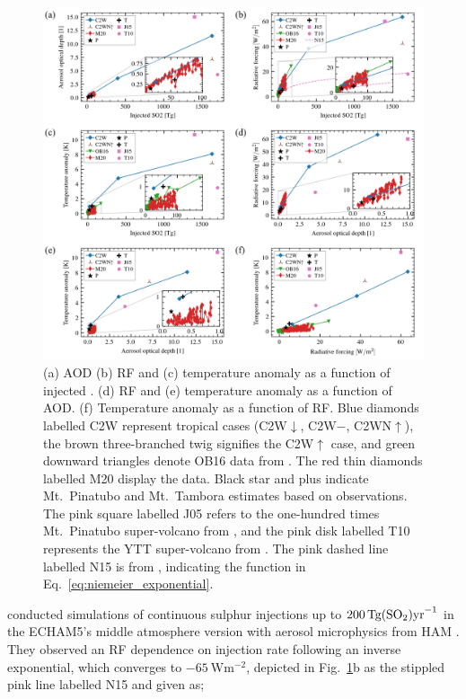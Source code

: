 \documentclass[draft]{agujournal2019}
\newcommand{\iso}[1][i]{{#1}njected \ce{SO2}}
\newcommand{\cwmp}{C2W\(-\)}
\newcommand{\cwm}{C2W\(\downarrow\)}
\newcommand{\cws}{C2WN\(\uparrow\)}
\newcommand{\cwsn}{C2W\(\uparrow\)}
\begin{document}
\begin{figure}
  \centering
  \includegraphics{figures/figure4.png}

  \caption{(a) AOD (b) RF and (c) temperature anomaly as a function of \iso{}\@. (d) RF
    and (e) temperature anomaly as a function of AOD. (f) Temperature anomaly as a function
    of RF. Blue diamonds labelled C2W represent tropical cases (\cwm{}, \cwmp{}, \cws{}),
    the brown three-branched twig signifies the \cwsn{} case, and green downward triangles
    denote OB16 data from . The red thin diamonds labelled M20
    display the  data. Black star and plus indicate Mt.\ Pinatubo
    and Mt.\ Tambora estimates based on observations. The pink square labelled J05 refers to
    the one-hundred times Mt.\ Pinatubo super-volcano from , and the pink
    disk labelled T10 represents the YTT super-volcano from . The pink
    dashed line labelled N15 is from , indicating the function in
    Eq.~\ref{eq:niemeier_exponential}.}\label{fig:parameter_scan}%
\end{figure}

 conducted simulations of continuous sulphur injections up to
\(\SI{200}{\tera\gram(\ce{SO2})\mathrm{yr}^{-1}}\) in the ECHAM5's middle atmosphere
version \cite{giorgetta2006} with aerosol microphysics from HAM \cite{stier2005}. They
observed an RF dependence on  injection rate following an inverse exponential,
which converges to \(\SI{-65}{\watt\meter^{-2}}\), depicted in
Fig.~\ref{fig:parameter_scan}b as the stippled pink line labelled N15 and given as;
\end{document}
